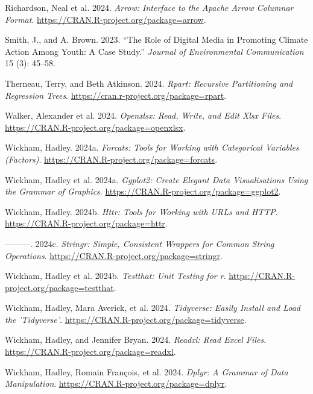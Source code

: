 \documentclass[
  letterpaper,
  DIV=11,
  numbers=noendperiod]{scrartcl}
\newlength{\cslhangindent}
\newenvironment{CSLReferences}[2] %
 {\begin{list}{}{%
  \setlength{\itemindent}{0pt}
  \setlength{\leftmargin}{0pt}
  \setlength{\parsep}{0pt}
  \ifodd #1
   \setlength{\leftmargin}{\cslhangindent}
   \setlength{\itemindent}{-1\cslhangindent}
  \fi
  \setlength{\itemsep}{#2\baselineskip}}}
 {\end{list}}
\begin{document}
\begin{CSLReferences}{1}{0}
Richardson, Neal et al. 2024. \emph{Arrow: Interface to the Apache Arrow
Columnar Format}. \url{https://CRAN.R-project.org/package=arrow}.

Smith, J., and A. Brown. 2023. {``The Role of Digital Media in Promoting
Climate Action Among Youth: A Case Study.''} \emph{Journal of
Environmental Communication} 15 (3): 45--58.

Therneau, Terry, and Beth Atkinson. 2024. \emph{Rpart: Recursive
Partitioning and Regression Trees}.
\url{https://cran.r-project.org/package=rpart}.

Walker, Alexander et al. 2024. \emph{Openxlsx: Read, Write, and Edit
Xlsx Files}. \url{https://CRAN.R-project.org/package=openxlsx}.

Wickham, Hadley. 2024a. \emph{Forcats: Tools for Working with
Categorical Variables (Factors)}.
\url{https://CRAN.R-project.org/package=forcats}.

Wickham, Hadley et al. 2024a. \emph{Ggplot2: Create Elegant Data
Visualisations Using the Grammar of Graphics}.
\url{https://CRAN.R-project.org/package=ggplot2}.

Wickham, Hadley. 2024b. \emph{Httr: Tools for Working with URLs and
HTTP}. \url{https://CRAN.R-project.org/package=httr}.

---------. 2024c. \emph{Stringr: Simple, Consistent Wrappers for Common
String Operations}. \url{https://CRAN.R-project.org/package=stringr}.

Wickham, Hadley et al. 2024b. \emph{Testthat: Unit Testing for r}.
\url{https://CRAN.R-project.org/package=testthat}.

Wickham, Hadley, Mara Averick, et al. 2024. \emph{Tidyverse: Easily
Install and Load the 'Tidyverse'}.
\url{https://CRAN.R-project.org/package=tidyverse}.

Wickham, Hadley, and Jennifer Bryan. 2024. \emph{Readxl: Read Excel
Files}. \url{https://CRAN.R-project.org/package=readxl}.

Wickham, Hadley, Romain François, et al. 2024. \emph{Dplyr: A Grammar of
Data Manipulation}. \url{https://CRAN.R-project.org/package=dplyr}.


\end{CSLReferences}
\end{document}
